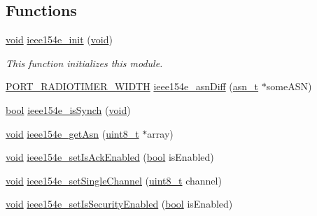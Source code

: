 \subsection*{Functions}
\begin{DoxyCompactItemize}
\item 
\hyperlink{usb__devapi_8h_afabf60e7f57651d6d595a02c75f07cd0}{void} \hyperlink{group___i_e_e_e802154_e_ga7f73e16007d858dc3b2708836fe81369}{ieee154e\+\_\+init} (\hyperlink{usb__devapi_8h_afabf60e7f57651d6d595a02c75f07cd0}{void})
\begin{DoxyCompactList}\small\item\em This function initializes this module. \end{DoxyCompactList}\item 
\hyperlink{z1_2board__info_8h_ac16e02aadd749b2d27638bed1a805a59}{P\+O\+R\+T\+\_\+\+R\+A\+D\+I\+O\+T\+I\+M\+E\+R\+\_\+\+W\+I\+D\+TH} \hyperlink{group___i_e_e_e802154_e_ga23506174c5642c8e1a8977f83101ffe5}{ieee154e\+\_\+asn\+Diff} (\hyperlink{structasn__t}{asn\+\_\+t} $\ast$some\+A\+SN)
\item 
\hyperlink{_p_e___types_8h_a97a80ca1602ebf2303258971a2c938e2}{bool} \hyperlink{group___i_e_e_e802154_e_ga4247cb86707287e4f0142293e224be74}{ieee154e\+\_\+is\+Synch} (\hyperlink{usb__devapi_8h_afabf60e7f57651d6d595a02c75f07cd0}{void})
\item 
\hyperlink{usb__devapi_8h_afabf60e7f57651d6d595a02c75f07cd0}{void} \hyperlink{group___i_e_e_e802154_e_ga97abcc8a5cf976a2e068fd865cc81ada}{ieee154e\+\_\+get\+Asn} (\hyperlink{_p_e___types_8h_aba7bc1797add20fe3efdf37ced1182c5}{uint8\+\_\+t} $\ast$array)
\item 
\hyperlink{usb__devapi_8h_afabf60e7f57651d6d595a02c75f07cd0}{void} \hyperlink{group___i_e_e_e802154_e_gabe670955c8a1280164a0821140e1845d}{ieee154e\+\_\+set\+Is\+Ack\+Enabled} (\hyperlink{_p_e___types_8h_a97a80ca1602ebf2303258971a2c938e2}{bool} is\+Enabled)
\item 
\hyperlink{usb__devapi_8h_afabf60e7f57651d6d595a02c75f07cd0}{void} \hyperlink{group___i_e_e_e802154_e_ga2b0e869933273f2b47d1a82350c8cdcb}{ieee154e\+\_\+set\+Single\+Channel} (\hyperlink{_p_e___types_8h_aba7bc1797add20fe3efdf37ced1182c5}{uint8\+\_\+t} channel)
\item 
\hyperlink{usb__devapi_8h_afabf60e7f57651d6d595a02c75f07cd0}{void} \hyperlink{group___i_e_e_e802154_e_ga18931c5576f24c9d37ec351a8a2c8f4e}{ieee154e\+\_\+set\+Is\+Security\+Enabled} (\hyperlink{_p_e___types_8h_a97a80ca1602ebf2303258971a2c938e2}{bool} is\+Enabled)
\item 

\end{DoxyCompactItemize}
